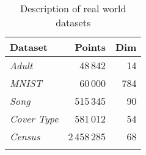 \begin{table}[htbp]
    \centering
    \begin{tabular}{lrr}
        Dataset & Points & Dim \\
        \hline
        \emph{Adult} & 48\,842 & 14 \\
        \emph{MNIST} & 60\,000 & 784 \\
        \emph{Song} & 515\,345 & 90 \\
        \emph{Cover Type} & 581\,012 & 54 \\
        \emph{Census} & 2\,458\,285 & 68 \\
        \hline
        \vspace*{0.1cm}
    \end{tabular}
    \caption{Description of real world datasets}
    \label{tbl:datasets}
\end{table}

